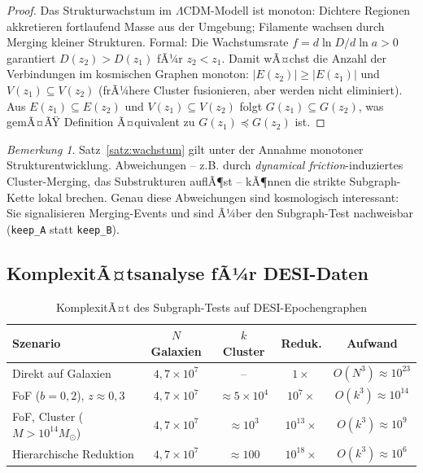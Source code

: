 ﻿\documentclass[a4paper,12pt]{article}
\theoremstyle{definition}
\theoremstyle{remark}
\newtheorem{bemerkung}{Bemerkung}[section]
\begin{document}
\begin{proof}
  Das Strukturwachstum im $\Lambda$CDM-Modell ist monoton: Dichtere Regionen
  akkretieren fortlaufend Masse aus der Umgebung; Filamente wachsen durch
  Merging kleiner Strukturen. Formal: Die Wachstumsrate $f = d\ln D/d\ln a > 0$
  garantiert $D(z_2) > D(z_1)$ fÃ¼r $z_2 < z_1$. Damit wÃ¤chst die Anzahl der
  Verbindungen im kosmischen Graphen monoton:
  $|E(z_2)| \geq |E(z_1)|$ und $V(z_1) \subseteq V(z_2)$ (frÃ¼here Cluster
  fusionieren, aber werden nicht eliminiert). Aus $E(z_1) \subseteq E(z_2)$
  und $V(z_1) \subseteq V(z_2)$ folgt $G(z_1) \subseteq G(z_2)$, was
  gemÃ¤ÃŸ Definition Ã¤quivalent zu $G(z_1) \preceq G(z_2)$ ist.
\end{proof}

\begin{bemerkung}
  Satz~\ref{satz:wachstum} gilt unter der Annahme monotoner Strukturentwicklung.
  Abweichungen -- z.B. durch \textit{dynamical friction}-induziertes
  Cluster-Merging, das Substrukturen auflÃ¶st -- kÃ¶nnen die strikte
  Subgraph-Kette lokal brechen. Genau diese Abweichungen sind
  kosmologisch interessant: Sie signalisieren Merging-Events und sind
  Ã¼ber den Subgraph-Test nachweisbar (\texttt{keep\_A} statt
  \texttt{keep\_B}).
\end{bemerkung}

\subsection{KomplexitÃ¤tsanalyse fÃ¼r DESI-Daten}

\begin{table}[H]
  \centering
  \caption{KomplexitÃ¤t des Subgraph-Tests auf DESI-Epochengraphen}
  \label{tab:complexity}
  \begin{tabular}{lcccc}
    \toprule
    \textbf{Szenario} & \textbf{$N$ Galaxien} & \textbf{$k$ Cluster} & \textbf{Reduk.} & \textbf{Aufwand} \\
    \midrule
    Direkt auf Galaxien & $4{,}7\times10^7$ & -- & $1\times$ & $O(N^3) \approx 10^{23}$ \\
    FoF ($b=0{,}2$), $z\approx0{,}3$ & $4{,}7\times10^7$ & $\approx 5\times10^4$ & $10^7\times$ & $O(k^3) \approx 10^{14}$ \\
    FoF, Cluster ($M>10^{14}M_\odot$) & $4{,}7\times10^7$ & $\approx 10^3$ & $10^{13}\times$ & $O(k^3) \approx 10^9$ \\
    Hierarchische Reduktion & $4{,}7\times10^7$ & $\approx 100$ & $10^{18}\times$ & $O(k^3) \approx 10^6$ \\
    \bottomrule
  \end{tabular}
\end{table}
\end{document}

